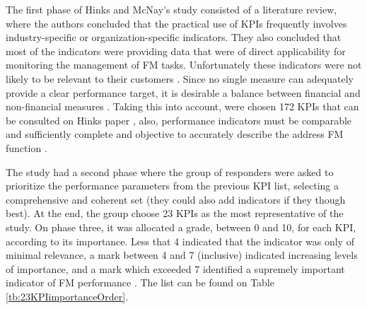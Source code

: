 The first phase of Hinks and McNay's study consisted of a literature review, where the authors concluded that the practical use of KPIs frequently involves industry-specific or organization-specific indicators. They also concluded that most of the indicators were providing data that were of direct applicability for monitoring the management of FM tasks. Unfortunately these indicators were not likely to be relevant to their customers \cite{Hinks1999}. 
Since no single measure can adequately provide a clear performance target, it is desirable a balance between financial and non-financial measures \cite{Slater1997}. Taking this into account, were chosen 172 KPIs that can be consulted on Hinks paper \cite{Hinks1999}, also, performance indicators must be comparable and sufficiently complete and objective to accurately describe the address FM function \cite{Wang1992}.

The study had a second phase where the group of responders were asked to prioritize the performance parameters from the previous KPI list, selecting a comprehensive and coherent set (they could also add indicators if they though best). At the end, the group choose 23 KPIs as the most representative of the study.
On phase three, it was allocated a grade, between 0 and 10, for each KPI, according to its importance. Less that 4 indicated that the indicator was only of minimal relevance, a mark between 4 and 7 (inclusive) indicated increasing levels of importance, and a mark which exceeded 7 identified a supremely important indicator of FM performance \cite{Hinks1999}. The list can be found on Table \ref{tb:23KPIimportanceOrder}.


